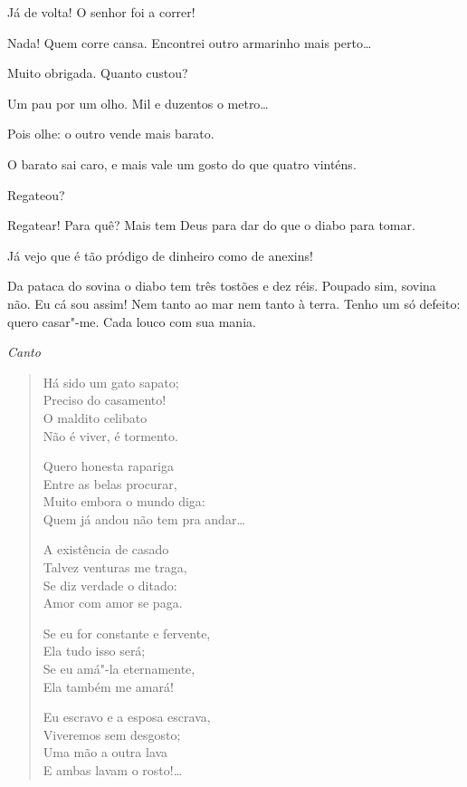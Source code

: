 \begin{linenumbers}
  Já de volta! O senhor foi a correr!

  Nada! Quem corre cansa. Encontrei outro armarinho mais
perto\ldots{}

   Muito obrigada. Quanto custou?

  Um pau por um olho. Mil e duzentos o metro\ldots{}

  Pois olhe: o outro vende mais barato.

  O barato sai caro, e mais vale um gosto do que quatro vinténs.

  Regateou?

  Regatear! Para quê? Mais tem Deus para dar do que o diabo para
tomar.

  Já vejo que é tão pródigo de dinheiro como de anexins!

  Da pataca do sovina o diabo tem três tostões e dez réis. Poupado
sim, sovina não.
Eu cá sou assim! Nem tanto ao mar nem tanto à terra. Tenho um só defeito: quero
casar"-me. Cada louco com sua mania.

{\smallskip\raggedleft\itshape Canto\par}
\begin{verse} 
Há sido um gato sapato;\\
Preciso do casamento!\\
O maldito celibato\\
Não é viver, é tormento.

Quero honesta rapariga\\
Entre as belas procurar,\\
Muito embora o mundo diga:\\
Quem já andou não tem pra andar\ldots{}

A existência de casado\\
Talvez venturas me traga,\\
Se diz verdade o ditado:\\
Amor com amor se paga.

Se eu for constante e fervente,\\
Ela tudo isso será;\\
Se eu amá"-la eternamente,\\
Ela também me amará!

Eu escravo e a esposa escrava,\\
Viveremos sem desgosto;\\
Uma mão a outra lava\\
E ambas lavam o rosto!\ldots{}
\end{verse}


\end{linenumbers}
